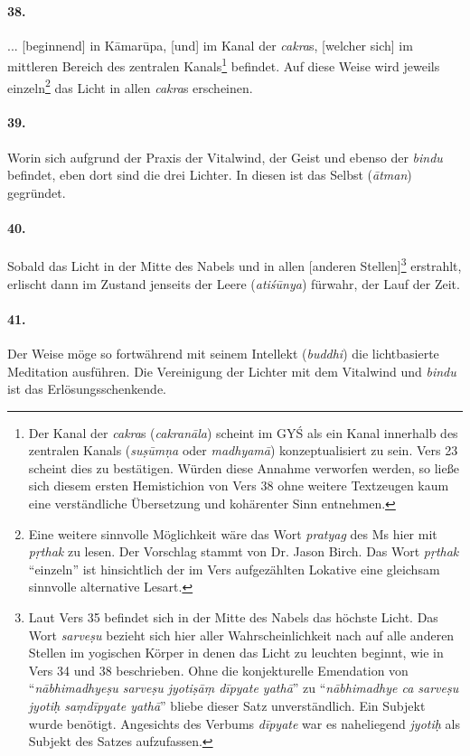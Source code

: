 \documentclass[a4paper,12pt]{article}
\begin{document}
\paragraph{38.} ... [beginnend] in Kāmarūpa, [und] im Kanal der \textit{cakra}s, [welcher sich] im mittleren Bereich des zentralen Kanals\footnote{Der Kanal der \textit{cakra}s (\textit{cakranāla}) scheint im GYŚ als ein Kanal innerhalb des zentralen Kanals (\textit{suṣūmṇa} oder \textit{madhyamā}) konzeptualisiert zu sein. Vers 23 scheint dies zu bestätigen. Würden diese Annahme verworfen werden, so ließe sich diesem ersten Hemistichion von Vers 38 ohne weitere Textzeugen kaum eine verständliche Übersetzung und kohärenter Sinn entnehmen.} befindet. Auf diese Weise wird jeweils einzeln\footnote{Eine weitere sinnvolle Möglichkeit wäre das Wort \textit{pratyag} des Ms hier mit \textit{pṛthak} zu lesen. Der Vorschlag stammt von Dr. Jason Birch. Das Wort \textit{pṛthak} ``einzeln'' ist hinsichtlich der im Vers aufgezählten Lokative eine gleichsam sinnvolle alternative Lesart.} das Licht in allen \textit{cakra}s erscheinen.

\paragraph{39.} Worin sich aufgrund der Praxis der Vitalwind, der Geist und ebenso der \textit{bindu} befindet, eben dort sind die drei Lichter. In diesen ist das Selbst (\textit{ātman}) gegründet.

\paragraph{40.} Sobald das Licht in der Mitte des Nabels und in allen [anderen Stellen]\footnote{Laut Vers 35 befindet sich in der Mitte des Nabels das höchste Licht. Das Wort \textit{sarveṣu} bezieht sich hier aller Wahrscheinlichkeit nach auf alle anderen Stellen im yogischen Körper in denen das Licht zu leuchten beginnt, wie in Vers 34 und 38 beschrieben. Ohne die konjekturelle Emendation von ``\textit{nābhimadhyeṣu sarveṣu jyotiṣāṃ dīpyate yathā}'' zu ``\textit{nābhimadhye ca sarveṣu jyotiḥ saṃdīpyate yathā}'' bliebe dieser Satz unverständlich. Ein Subjekt wurde benötigt. Angesichts des Verbums \textit{dīpyate} war es naheliegend \textit{jyotiḥ} als Subjekt des Satzes aufzufassen.} erstrahlt, erlischt dann im Zustand jenseits der Leere (\textit{atiśūnya}) fürwahr, der Lauf der Zeit. 

\paragraph{41.} Der Weise möge so fortwährend mit seinem Intellekt (\textit{buddhi}) die lichtbasierte Meditation ausführen. Die Vereinigung der Lichter mit dem Vitalwind und \textit{bindu} ist das Erlösungsschenkende.
\end{document}
